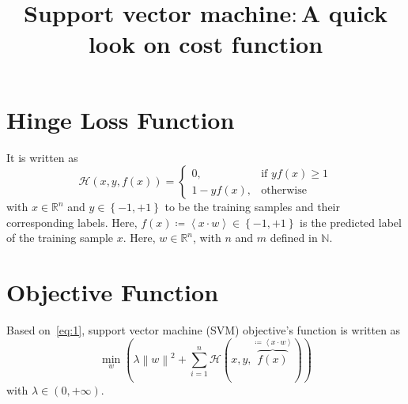 \documentclass[a4paper,11pt]{article}
\begin{document}
\title{
Support vector machine$\colon$A quick look on cost function
}
\maketitle
\section{Hinge Loss Function}\label{sec-1}
It is written as
%
\begin{equation}
	\mathcal{H}\left(x,y,f\left(x\right)\right)=
	\begin{cases}
       0                                 , & \text{if }         y f\left(x\right) \geq 1\\
       1-y f\left(x\right)          , & \text{otherwise}
	\end{cases}
\label{eq:1}
\end{equation}
%
with $x\in\mathbb{R}^n$ and $y\in\left\{-1,+1\right\}$ to be the training samples and their corresponding labels. Here, $f\left(x\right)\coloneqq\left<x\cdot w\right>\in\left\{-1,+1\right\}$ is the predicted label of the training sample $x$. Here, $w\in\mathbb{R}^n$, with $n$ and $m$ defined in $\mathbb{N}$.
\section{Objective Function}\label{sec-2}
Based on~\eqref{eq:1}, support vector machine (SVM) objective's function is written as
%
\begin{equation}
\min_{w}{\left(\lambda\left\|w\right\|^2+\sum_{i=1}^{n}{\mathcal{H}
         \left(x,y,\overbrace{f\left(x\right)}^{\coloneqq\left<x\cdot w\right>}\right)}\right)}
\label{eq:2}         
\end{equation}
%
with $\lambda\in\left(0,+\infty\right)$.
\end{document}
